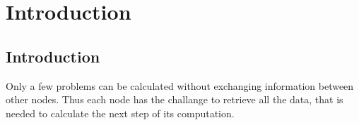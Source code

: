 \chapter{Introduction}
\label{sec:intro}



\section{Introduction}

Only a few problems can be calculated without exchanging information
between other nodes. Thus each node has the challange to retrieve all
the data, that is needed to calculate the next step of its
computation.

